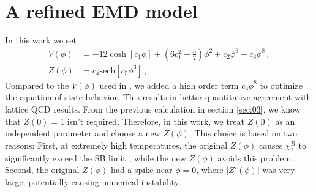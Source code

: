 \documentclass[a4paper,12pt]{article}
\numberwithin{equation}{section}
\begin{document}
\section{A refined EMD model}\label{sec:05}
In this work we set 
%
\begin{equation}\label{eq51}
\begin{split}
 V(\phi)&=-12 \cosh\left[c_1\phi\right]+\left(6c_1^2-\frac{3}{2}\right)\phi^2+c_2\phi^6 +c_3 \phi^8   \,, \\
Z(\phi)&=c_4 \text{sech}\left[ c_5 \phi^3 \right]\,,
\end{split}
\end{equation}
%
Compared to the $V(\phi)$ used in \cite{Cai:2022omk,Li:2023mpv}, we added a high order term $c_3 \phi^8$ to optimize the equation of state behavior. This results in better quantitative agreement with lattice QCD results. From the previous calculation in section \ref{sec:03}, we know that $Z(0) = 1$ isn't required. Therefore, in this work, we treat $Z(0)$ as an independent parameter and choose a new $Z(\phi)$. This choice is based on two reasons: First, at extremely high temperatures, the original $Z(\phi)$ causes $\chi_2^B$ to significantly exceed the SB limit \cite{Jokela:2024xgz,Fu:2024wkn}, while the new $Z(\phi)$ avoids this problem. Second, the original $Z(\phi)$ had a spike near $\phi = 0$, where $|Z'(\phi)|$ was very large, potentially causing numerical instability.
\end{document}
